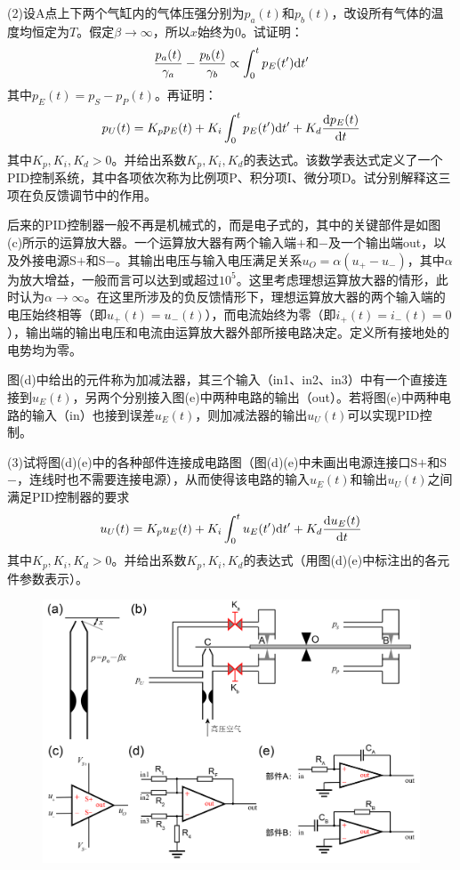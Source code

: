 \documentclass[11pt,a4paper,onecolumn,UTF8]{ctexart}
\begin{document}
	(2)设A点上下两个气缸内的气体压强分别为$p_a(t)$和$p_b(t)$，改设所有气体的温度均恒定为$T$。假定$\beta\to\infty$，所以$x$始终为$0$。试证明：
	\begin{equation*}
		\frac{p_a(t)}{\gamma_a} -\frac{p_b(t)}{\gamma_b} \propto\int_0^t p_E(t')\mathrm{d} t'
	\end{equation*}
	其中$p_E(t)=p_S-p_P(t)$。再证明：
	\begin{equation*}
		p_U(t)=K_p p_E(t)+K_i\int_0^t p_E(t')\mathrm{d} t'+K_d\frac{\mathrm{d} p_E(t)}{\mathrm{d} t}
	\end{equation*}
	其中$K_p,K_i,K_d>0$。并给出系数$K_p,K_i,K_d$的表达式。该数学表达式定义了一个PID控制系统，其中各项依次称为比例项P、积分项I、微分项D。试分别解释这三项在负反馈调节中的作用。
	
	后来的PID控制器一般不再是机械式的，而是电子式的，其中的关键部件是如图(c)所示的运算放大器。一个运算放大器有两个输入端$+$和$-$及一个输出端out，以及外接电源S$+$和S$-$。其输出电压与输入电压满足关系$u_O=\alpha(u_+-u_-)$，其中$\alpha$为放大增益，一般而言可以达到或超过$10^5$。这里考虑理想运算放大器的情形，此时认为$\alpha\to\infty$。在这里所涉及的负反馈情形下，理想运算放大器的两个输入端的电压始终相等（即$u_+(t)=u_-(t)$），而电流始终为零（即$i_+(t)=i_-(t)=0$），输出端的输出电压和电流由运算放大器外部所接电路决定。定义所有接地处的电势均为零。
	
	图(d)中给出的元件称为加减法器，其三个输入（in1、in2、in3）中有一个直接连接到$u_E(t)$，另两个分别接入图(e)中两种电路的输出（out）。若将图(e)中两种电路的输入（in）也接到误差$u_E(t)$，则加减法器的输出$u_U(t)$可以实现PID控制。
	
	(3)试将图(d)(e)中的各种部件连接成电路图（图(d)(e)中未画出电源连接口S$+$和S$-$，连线时也不需要连接电源），从而使得该电路的输入$u_E(t)$和输出$u_U(t)$之间满足PID控制器的要求
	\begin{equation*}
		u_U(t)=K_p u_E(t)+K_i\int_0^t u_E(t')\mathrm{d} t'+K_d\frac{\mathrm{d} u_E(t)}{\mathrm{d} t}
	\end{equation*}
	其中$K_p,K_i,K_d>0$。并给出系数$K_p,K_i,K_d$的表达式（用图(d)(e)中标注出的各元件参数表示）。
	
	\begin{figure}[!h]
		\centering
		\includegraphics[width=0.99\columnwidth]{7.png}
	\end{figure}
	
\end{document}
